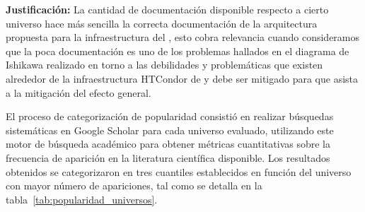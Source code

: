 \textbf{Justificación:} La cantidad de documentación disponible respecto a cierto
universo hace más sencilla la correcta documentación de la arquitectura
propuesta para la infraestructura del \GRID, esto cobra relevancia cuando
consideramos que la poca documentación es uno de los problemas hallados en
el diagrama de Ishikawa realizado en torno a las debilidades y problemáticas que
existen alrededor de la infraestructura HTCondor de \GRID y debe ser mitigado
para que asista a la mitigación del efecto general.

El proceso de categorización de popularidad consistió en realizar búsquedas sistemáticas en Google Scholar para cada universo evaluado, utilizando este motor de búsqueda académico para obtener métricas cuantitativas sobre la frecuencia de aparición en la literatura científica disponible. Los resultados obtenidos se categorizaron en tres cuantiles establecidos en función del universo con mayor número de apariciones, tal como se detalla en la tabla~\ref{tab:popularidad_universos}.


